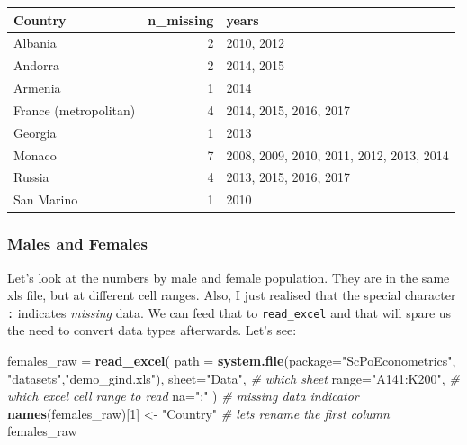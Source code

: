 \documentclass[]{book}
\newenvironment{Shaded}{\begin{snugshade}}{\end{snugshade}}
\newcommand{\KeywordTok}[1]{\textcolor[rgb]{0.13,0.29,0.53}{\textbf{#1}}}
\newcommand{\DataTypeTok}[1]{\textcolor[rgb]{0.13,0.29,0.53}{#1}}
\newcommand{\DecValTok}[1]{\textcolor[rgb]{0.00,0.00,0.81}{#1}}
\newcommand{\StringTok}[1]{\textcolor[rgb]{0.31,0.60,0.02}{#1}}
\newcommand{\CommentTok}[1]{\textcolor[rgb]{0.56,0.35,0.01}{\textit{#1}}}
\newcommand{\NormalTok}[1]{#1}
\begin{document}
\begin{tabular}{l|r|l}
\hline
Country & n\_missing & years\\
\hline
Albania & 2 & 2010, 2012\\
\hline
Andorra & 2 & 2014, 2015\\
\hline
Armenia & 1 & 2014\\
\hline
France (metropolitan) & 4 & 2014, 2015, 2016, 2017\\
\hline
Georgia & 1 & 2013\\
\hline
Monaco & 7 & 2008, 2009, 2010, 2011, 2012, 2013, 2014\\
\hline
Russia & 4 & 2013, 2015, 2016, 2017\\
\hline
San Marino & 1 & 2010\\
\hline
\end{tabular}

\subsubsection*{Males and Females}\label{males-and-females}

Let's look at the numbers by male and female population. They are in the
same xls file, but at different cell ranges. Also, I just realised that
the special character \texttt{:} indicates \emph{missing} data. We can
feed that to \texttt{read\_excel} and that will spare us the need to
convert data types afterwards. Let's see:

\begin{Shaded}
\begin{Highlighting}[]
\NormalTok{females_raw =}\StringTok{ }\KeywordTok{read_excel}\NormalTok{(}
                \DataTypeTok{path =} \KeywordTok{system.file}\NormalTok{(}\DataTypeTok{package=}\StringTok{"ScPoEconometrics"}\NormalTok{,}
                                    \StringTok{"datasets"}\NormalTok{,}\StringTok{"demo_gind.xls"}\NormalTok{), }
                \DataTypeTok{sheet=}\StringTok{"Data"}\NormalTok{, }\CommentTok{# which sheet}
                \DataTypeTok{range=}\StringTok{"A141:K200"}\NormalTok{,  }\CommentTok{# which excel cell range to read}
                \DataTypeTok{na=}\StringTok{":"}\NormalTok{ )   }\CommentTok{# missing data indicator}
\KeywordTok{names}\NormalTok{(females_raw)[}\DecValTok{1}\NormalTok{] <-}\StringTok{ "Country"}   \CommentTok{# lets rename the first column}
\NormalTok{females_raw}
\end{Highlighting}
\end{Shaded}
\end{document}
